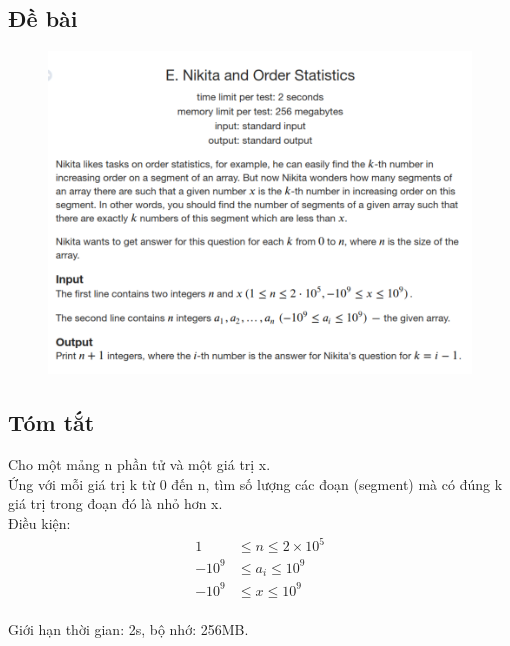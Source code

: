 \documentclass[../report.tex]{subfiles}
\begin{document}
\subsection{Đề bài} \cite{problem-993e}
\begin{figure}[H]
\centering
\includegraphics[width=\textwidth]{figures/993E.png}
\end{figure}

\subsection{Tóm tắt}
Cho một mảng n phần tử và một giá trị x. \\
Ứng với mỗi giá trị k từ 0 đến n, tìm số lượng các đoạn (segment) 
mà có đúng k giá trị trong đoạn đó là nhỏ hơn x.  \\
Điều kiện:
\begin{align*}
    1 &\le n \le 2 \times 10^5 \\
    -10^9 &\le a_i \le 10^9 \\
    -10^9 &\le x \le 10^9
\end{align*} \\
Giới hạn thời gian: 2s, bộ nhớ: 256MB. 
\end{document}
